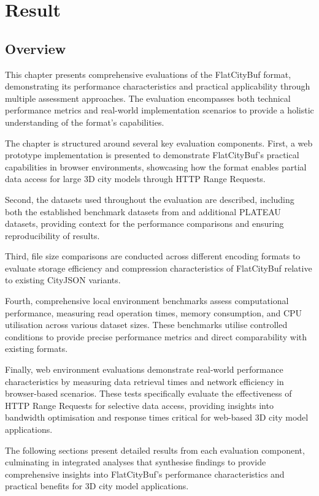 \chapter{Result}
\label{chp:result}
\section{Overview}
\label{result:overview}
This chapter presents comprehensive evaluations of the FlatCityBuf format, demonstrating its performance characteristics and practical applicability through multiple assessment approaches. The evaluation encompasses both technical performance metrics and real-world implementation scenarios to provide a holistic understanding of the format's capabilities.

The chapter is structured around several key evaluation components. First, a web prototype implementation is presented to demonstrate FlatCityBuf's practical capabilities in browser environments, showcasing how the format enables partial data access for large 3D city models through HTTP Range Requests.

Second, the datasets used throughout the evaluation are described, including both the established benchmark datasets from \citet{ledoux_2024} and additional PLATEAU datasets, providing context for the performance comparisons and ensuring reproducibility of results.

Third, file size comparisons are conducted across different encoding formats to evaluate storage efficiency and compression characteristics of FlatCityBuf relative to existing CityJSON variants.

Fourth, comprehensive local environment benchmarks assess computational performance, measuring read operation times, memory consumption, and CPU utilisation across various dataset sizes. These benchmarks utilise controlled conditions to provide precise performance metrics and direct comparability with existing formats.

Finally, web environment evaluations demonstrate real-world performance characteristics by measuring data retrieval times and network efficiency in browser-based scenarios. These tests specifically evaluate the effectiveness of HTTP Range Requests for selective data access, providing insights into bandwidth optimisation and response times critical for web-based 3D city model applications.

The following sections present detailed results from each evaluation component, culminating in integrated analyses that synthesise findings to provide comprehensive insights into FlatCityBuf's performance characteristics and practical benefits for 3D city model applications.


